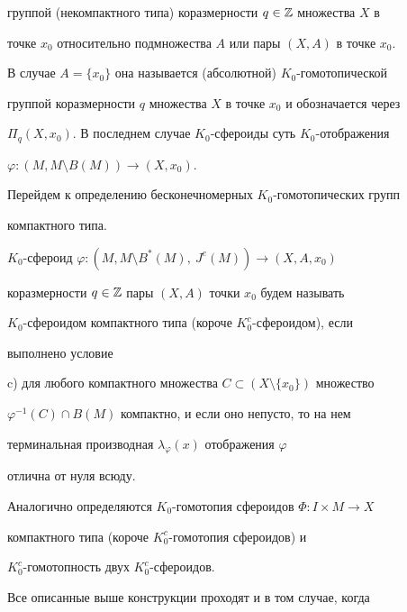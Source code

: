 группой (некомпактного типа) коразмерности $q\in\Bbb Z$ множества $X$ в 


точке $x_0$ относительно подмножества $A$ или пары $(X,A)$ в точке $x_0$. 


В случае $A=\{x_0\}$ она называется (абсолютной) $K_0$-гомотопической 


группой коразмерности $q$ множества $X$ в точке $x_0$ и обозначается через 


$\Pi_q(X,x_0)$. В последнем случае $K_0$-сфероиды суть $K_0$-отображения 


$\varphi:(M,M\setminus B(M))\to(X,x_0)$. 


 


Перейдем к определению бесконечномерных $K_0$-гомотопических групп 


компактного типа. 


 


\begin{defn} 


$K_0$-сфероид $\varphi:(M,M\setminus B^*(M),\ J^e(M))\to(X,A,x_0)$ 


коразмерности $q\in\Bbb Z$ пары $(X,A)$ точки $x_0$ будем называть 


$K_0$-сфероидом компактного типа (короче $K^c_0$-сфероидом), если 


выполнено условие 


 


c) для любого компактного множества $C\subset(X\setminus\{x_0\})$ множество 


$\varphi^{-1}(C)\cap B(M)$ компактно, и если оно непусто, то на нем 


терминальная производная $\lambda_\varphi(x)$ отображения $\varphi$ 


отлична от нуля всюду. 


\end{defn} 


 


Аналогично определяются $K_0$-гомотопия сфероидов $\Phi:I\times M\to X$ 


компактного типа (короче $K^c_0$-гомотопия сфероидов) и 


$K^c_0$-гомотопность двух $K^c_0$-сфероидов. 


 


Все описанные выше конструкции проходят и в том случае, когда 


